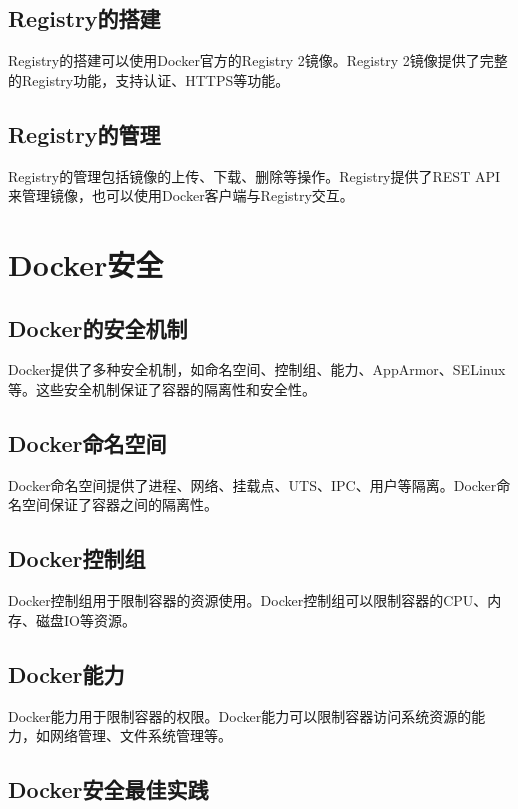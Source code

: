 \documentclass[12pt,UTF8]{ctexbook}
\begin{document}
\section{Registry的搭建}

Registry的搭建可以使用Docker官方的Registry 2镜像。Registry 2镜像提供了完整的Registry功能，支持认证、HTTPS等功能。

\section{Registry的管理}

Registry的管理包括镜像的上传、下载、删除等操作。Registry提供了REST API来管理镜像，也可以使用Docker客户端与Registry交互。

\chapter{Docker安全}

\section{Docker的安全机制}

Docker提供了多种安全机制，如命名空间、控制组、能力、AppArmor、SELinux等。这些安全机制保证了容器的隔离性和安全性。

\section{Docker命名空间}

Docker命名空间提供了进程、网络、挂载点、UTS、IPC、用户等隔离。Docker命名空间保证了容器之间的隔离性。

\section{Docker控制组}

Docker控制组用于限制容器的资源使用。Docker控制组可以限制容器的CPU、内存、磁盘IO等资源。

\section{Docker能力}

Docker能力用于限制容器的权限。Docker能力可以限制容器访问系统资源的能力，如网络管理、文件系统管理等。

\section{Docker安全最佳实践}
\end{document}
